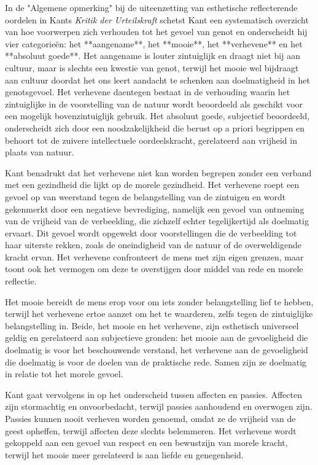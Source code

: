 \begin{mdframed}[leftmargin=0pt,rightmargin=0pt,backgroundcolor=blue!6,linecolor=white,innertopmargin=6pt,innerbottommargin=6pt]

In de "Algemene opmerking" bij de uiteenzetting van esthetische reflecterende oordelen in Kants \textit{Kritik der Urteilskraft} schetst Kant een systematisch overzicht van hoe voorwerpen zich verhouden tot het gevoel van genot en onderscheidt hij vier categorieën: het **aangename**, het **mooie**, het **verhevene** en het **absoluut goede**. Het aangename is louter zintuiglijk en draagt niet bij aan cultuur, maar is slechts een kwestie van genot, terwijl het mooie wel bijdraagt aan cultuur doordat het ons leert aandacht te schenken aan doelmatigheid in het genotsgevoel. Het verhevene daentegen bestaat in de verhouding waarin het zintuiglijke in de voorstelling van de natuur wordt beoordeeld als geschikt voor een mogelijk bovenzintuiglijk gebruik. Het absoluut goede, subjectief beoordeeld, onderscheidt zich door een noodzakelijkheid die berust op a priori begrippen en behoort tot de zuivere intellectuele oordeelskracht, gerelateerd aan vrijheid in plaats van natuur.

Kant benadrukt dat het verhevene niet kan worden begrepen zonder een verband met een gezindheid die lijkt op de morele gezindheid. Het verhevene roept een gevoel op van weerstand tegen de belangstelling van de zintuigen en wordt gekenmerkt door een negatieve bevrediging, namelijk een gevoel van ontneming van de vrijheid van de verbeelding, die zichzelf echter tegelijkertijd als doelmatig ervaart. Dit gevoel wordt opgewekt door voorstellingen die de verbeelding tot haar uiterste rekken, zoals de oneindigheid van de natuur of de overweldigende kracht ervan. Het verhevene confronteert de mens met zijn eigen grenzen, maar toont ook het vermogen om deze te overstijgen door middel van rede en morele reflectie.

Het mooie bereidt de mens erop voor om iets zonder belangstelling lief te hebben, terwijl het verhevene ertoe aanzet om het te waarderen, zelfs tegen de zintuiglijke belangstelling in. Beide, het mooie en het verhevene, zijn esthetisch universeel geldig en gerelateerd aan subjectieve gronden: het mooie aan de gevoeligheid die doelmatig is voor het beschouwende verstand, het verhevene aan de gevoeligheid die doelmatig is voor de doelen van de praktische rede. Samen zijn ze doelmatig in relatie tot het morele gevoel.

Kant gaat vervolgens in op het onderscheid tussen affecten en passies. Affecten zijn stormachtig en onvoorbedacht, terwijl passies aanhoudend en overwogen zijn. Passies kunnen nooit verheven worden genoemd, omdat ze de vrijheid van de geest opheffen, terwijl affecten deze slechts belemmeren. Het verhevene wordt gekoppeld aan een gevoel van respect en een bewustzijn van morele kracht, terwijl het mooie meer gerelateerd is aan liefde en genegenheid.


\end{mdframed}
